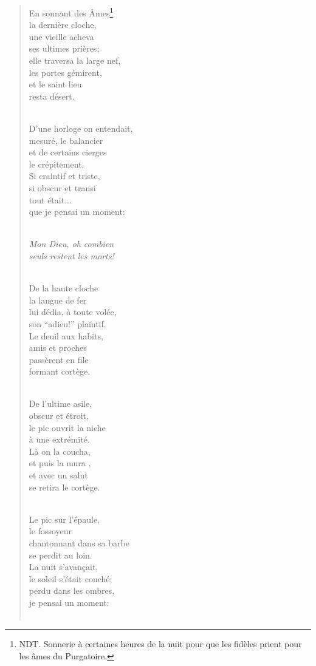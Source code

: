 \documentclass[a4paper,12pt]{book}
\begin{document}
\begin{verse}
En sonnant des Âmes\footnote{NDT. Sonnerie à certaines heures de la nuit pour que les fidèles prient pour les âmes du Purgatoire.} \\
la dernière cloche, \\
une vieille acheva \\
ses ultimes prières; \\
elle traversa la large nef, \\
les portes gémirent, \\
et le saint lieu \\
resta désert. \\ \

D'une horloge on entendait, \\
mesuré, le balancier \\
et de certains cierges \\
le crépitement. \\
Si craintif et triste, \\
si obscur et transi \\
tout était... \\
que je pensai un moment: \\ \

{\em Mon Dieu, oh combien \\
seuls restent les morts!} \\ \

De la haute cloche \\
la langue de fer \\
lui dédia, à toute volée, \\
son ``adieu!'' plaintif. \\
Le deuil aux habits, \\
amis et proches \\
passèrent en file \\
formant cortège. \\ \

De l'ultime asile, \\
obscur et étroit, \\
le pic ouvrit la niche \\
à une extrémité. \\
Là on la coucha, \\
et puis la mura , \\
et avec un salut \\
se retira le cortège. \\ \


Le pic sur l'épaule, \\
le fossoyeur \\
chantonnant dans sa barbe \\
se perdit au loin. \\
La nuit s'avan\c{c}ait, \\
le soleil s'était couché; \\
perdu dans les ombres, \\
je pensai un moment: \\ \


\end{verse}
\end{document}
